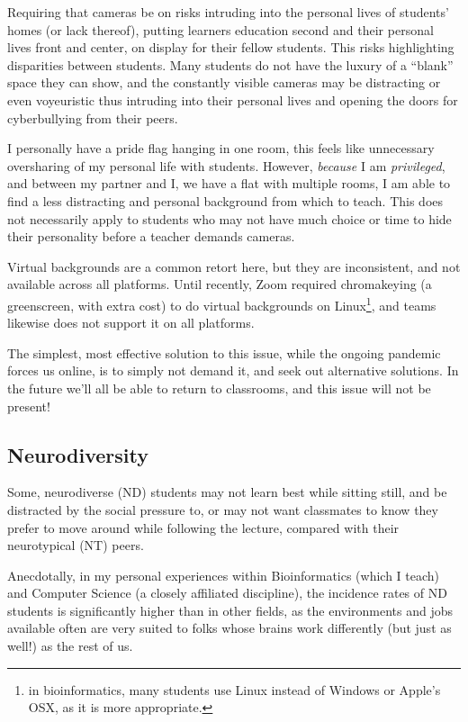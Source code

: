 \documentclass[paper=a4,justified,a4paper]{tufte-handout}
\begin{document}
Requiring that cameras be on risks intruding into the personal lives of
students' homes (or lack thereof), putting learners education second and
their personal lives front and center, on display for their fellow
students. This risks highlighting disparities between students. Many
students do not have the luxury of a ``blank'' space they can show, and
the constantly visible cameras may be distracting or even voyeuristic
\citep{reed_2020, ng2020communicative} thus intruding into their
personal lives and opening the doors for cyberbullying from their peers.

I personally have a pride flag hanging in one room, this feels like
unnecessary oversharing of my personal life with students. However,
\emph{because} I am \emph{privileged}, and between my partner and I, we
have a flat with multiple rooms, I am able to find a less distracting
and personal background from which to teach. This does not necessarily
apply to students who may not have much choice or time to hide their
personality before a teacher demands cameras.

Virtual backgrounds are a common retort here, but they are inconsistent,
and not available across all platforms. Until recently, Zoom required
chromakeying (a greenscreen, with extra cost) to do virtual backgrounds
on
Linux\footnote{in bioinformatics, many students use Linux instead of Windows or Apple's OSX, as it is more appropriate.},
and teams likewise does not support it on all platforms.

The simplest, most effective solution to this issue, while the ongoing
pandemic forces us online, is to simply not demand it, and seek out
alternative solutions. In the future we'll all be able to return to
classrooms, and this issue will not be present!

\hypertarget{neurodiversity}{%
\subsection{Neurodiversity}\label{neurodiversity}}

Some, neurodiverse (ND) students may not learn best while sitting still,
and be distracted by the social pressure to, or may not want classmates
to know they prefer to move around while following the
lecture\citep{duncan2021}, compared with their neurotypical (NT) peers.

Anecdotally, in my personal experiences within Bioinformatics (which I
teach) and Computer Science (a closely affiliated discipline), the
incidence rates of ND students is significantly higher than in other
fields, as the environments and jobs available often are very suited to
folks whose brains work differently (but just as well!) as the rest of
us.
\end{document}
